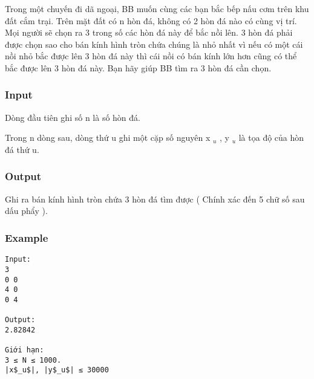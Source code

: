 



   Trong một chuyến đi dã ngoại, BB muốn cùng các bạn bắc bếp nấu cơm trên khu đất cắm trại. Trên mặt đất có n hòn đá, không có 2 hòn đá nào có cùng vị trí. Mọi người sẽ chọn ra 3 trong số các hòn đá này để bắc nồi lên. 3 hòn đá phải được chọn sao cho bán kính hình tròn chứa chúng là nhỏ nhất vì nếu có một cái nồi nhỏ bắc được lên 3 hòn đá này thì cái nồi có bán kính lớn hơn cũng có thể bắc được lên 3 hòn đá này. Bạn hãy giúp BB tìm ra 3 hòn đá cần chọn.  

\subsubsection{   Input  }

   Dòng đầu tiên ghi số n là số hòn đá.  

   Trong n dòng sau, dòng thứ u ghi một cặp số nguyên x   $_    u   $   , y   $_    u   $   là tọa độ của hòn đá thứ u.  

\subsubsection{   Output  }

   Ghi ra bán kính hình tròn chứa 3 hòn đá tìm được ( Chính xác đến 5 chữ số sau dấu phẩy ).  

\subsubsection{   Example  }
\begin{verbatim}
Input:
3
0 0
4 0
0 4

Output:
2.82842

Giới hạn:
3 ≤ N ≤ 1000. 
|x$_u$|, |y$_u$| ≤ 30000

\end{verbatim}